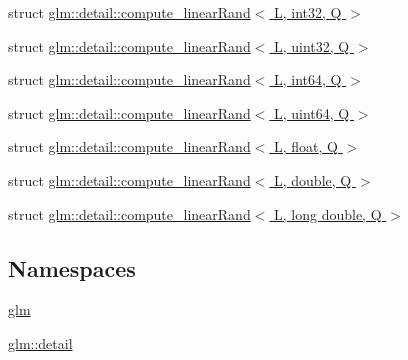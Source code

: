 \begin{DoxyCompactItemize}
\item 
struct \hyperlink{structglm_1_1detail_1_1compute__linear_rand_3_01_l_00_01int32_00_01_q_01_4}{glm\+::detail\+::compute\+\_\+linear\+Rand$<$ L, int32, Q $>$}
\item 
struct \hyperlink{structglm_1_1detail_1_1compute__linear_rand_3_01_l_00_01uint32_00_01_q_01_4}{glm\+::detail\+::compute\+\_\+linear\+Rand$<$ L, uint32, Q $>$}
\item 
struct \hyperlink{structglm_1_1detail_1_1compute__linear_rand_3_01_l_00_01int64_00_01_q_01_4}{glm\+::detail\+::compute\+\_\+linear\+Rand$<$ L, int64, Q $>$}
\item 
struct \hyperlink{structglm_1_1detail_1_1compute__linear_rand_3_01_l_00_01uint64_00_01_q_01_4}{glm\+::detail\+::compute\+\_\+linear\+Rand$<$ L, uint64, Q $>$}
\item 
struct \hyperlink{structglm_1_1detail_1_1compute__linear_rand_3_01_l_00_01float_00_01_q_01_4}{glm\+::detail\+::compute\+\_\+linear\+Rand$<$ L, float, Q $>$}
\item 
struct \hyperlink{structglm_1_1detail_1_1compute__linear_rand_3_01_l_00_01double_00_01_q_01_4}{glm\+::detail\+::compute\+\_\+linear\+Rand$<$ L, double, Q $>$}
\item 
struct \hyperlink{structglm_1_1detail_1_1compute__linear_rand_3_01_l_00_01long_01double_00_01_q_01_4}{glm\+::detail\+::compute\+\_\+linear\+Rand$<$ L, long double, Q $>$}
\end{DoxyCompactItemize}
\subsection*{Namespaces}
\begin{DoxyCompactItemize}
\item 
 \hyperlink{namespaceglm}{glm}
\item 
 \hyperlink{namespaceglm_1_1detail}{glm\+::detail}
\end{DoxyCompactItemize}

